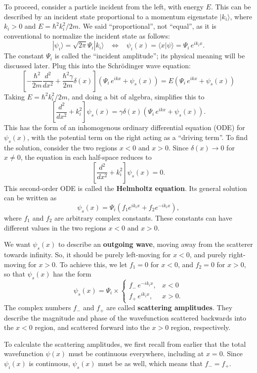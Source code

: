 \documentclass[pra,12pt]{revtex4}
\begin{document}
To proceed, consider a particle incident from the left, with energy
$E$.  This can be described by an incident state proportional to a
momentum eigenstate $|k_i\rangle$, where $k_i > 0$ and $E =
\hbar^2k_i^2/2m$.  We said ``proportional'', not ``equal'', as it is
conventional to normalize the incident state as follows:
$$|\psi_i\rangle = \sqrt{2\pi}\Psi_i |k_i\rangle \;\;\; \Leftrightarrow\;\;\; \psi_i(x) = \langle x|\psi\rangle = \Psi_i \, e^{ik_i x}.$$
The constant $\Psi_i$ is called the ``incident amplitude''; its
physical meaning will be discussed later.  Plug this into the
Schr\"odinger wave equation:
$$\left[-\frac{\hbar^2}{2m} \frac{d^2}{dx^2} + \frac{\hbar^2\gamma}{2m}\delta(x)\right] \left(\Psi_i \, e^{ikx} + \psi_s(x) \right) = E \left(\Psi_i \, e^{ikx} + \psi_s(x) \right)$$
Taking $E = \hbar^2k_i^2/2m$, and doing a bit of algebra, simplifies this to
$$\left[ \frac{d^2}{dx^2} + k_i^2\right] \psi_s(x) =  \gamma \delta(x) \left(\Psi_i \, e^{ikx} + \psi_s(x) \right).$$
This has the form of an inhomogenous ordinary differential equation (ODE)
for $\psi_s(x)$, with the potential term on the right acting
as a ``driving term''.  To find the solution, consider the two regions $x <
0$ and $x > 0$.  Since $\delta(x) \rightarrow 0$ for $x \ne 0$, the
equation in each half-space reduces to
$$\left[\frac{d^2}{dx^2} + k_i^2\right] \psi_s(x) = 0.$$
This second-order ODE is called the \textbf{Helmholtz equation}.  Its
general solution can be written as
$$\psi_s(x) = \Psi_i \left(f_1 e^{ik_i x} + f_2 e^{-ik_i x}\right),$$
where $f_1$ and $f_2$ are arbitrary complex constants.  These
constants can have different values in the two regions $x < 0$ and $x
> 0$.

We want $\psi_s(x)$ to describe an \textbf{outgoing wave}, moving away
from the scatterer towards infinity.  So, it should be purely
left-moving for $x < 0$, and purely right-moving for $x > 0$.  To
achieve this, we let $f_1 = 0$ for $x < 0$, and $f_2 = 0$ for $x > 0$,
so that $\psi_s(x)$ has the form
$$\psi_s(x) = \Psi_i \times \begin{cases}f_- \,e^{-ik_ix}, & x < 0 \\ f_+ \,e^{ik_ix}, & x > 0.\end{cases}$$
The complex numbers $f_-$ and $f_+$ are called \textbf{scattering
  amplitudes}.  They describe the magnitude and phase of the
wavefunction scattered backwards into the $x<0$ region, and scattered
forward into the $x > 0$ region, respectively.

To calculate the scattering amplitudes, we first recall from earlier
that the total wavefunction $\psi(x)$ must be continuous everywhere,
including at $x = 0$.  Since $\psi_i(x)$ is continuous, $\psi_s(x)$
must be as well, which means that $f_- = f_+$.
\end{document}
